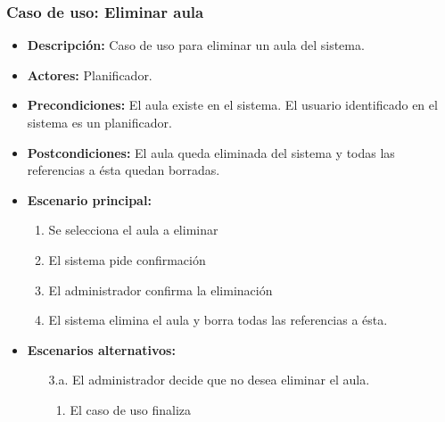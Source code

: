 \subsubsection*{Caso de uso: Eliminar aula}
\begin{itemize}
\item{\bf Descripción:} Caso de uso para eliminar un aula del sistema.
\item{\bf Actores:} Planificador.
\item{\bf Precondiciones:} El aula existe en el sistema. El usuario identificado en el sistema es un planificador.
\item{\bf Postcondiciones:} El aula queda eliminada del sistema y todas las referencias a ésta quedan borradas.
\item{\bf Escenario principal:}
	\begin{enumerate}
	\item Se selecciona el aula a eliminar
	\item El sistema pide confirmación
	\item El administrador confirma la eliminación
	\item El sistema elimina el aula y borra todas las referencias a ésta.
	\end{enumerate}
\item{\bf Escenarios alternativos:}
	\begin{itemize}
		\item[3.a.] El administrador decide que no desea eliminar el aula.
		\begin{enumerate}
			\item El caso de uso finaliza
		\end{enumerate}
	\end{itemize}
\end{itemize}



